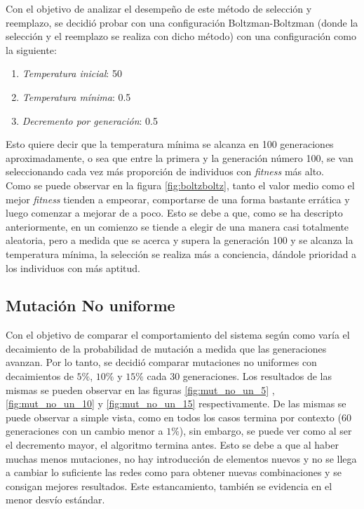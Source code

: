 \documentclass{sig-alternate}
\begin{document}
		Con el objetivo de analizar el desempeño de este método de selección y reemplazo, se decidió probar con una configuración Boltzman-Boltzman (donde la selección y el reemplazo se realiza con dicho método) con una configuración como la siguiente:
			
		\begin{enumerate}			
			\item \textit{Temperatura inicial}: 50
			\item \textit{Temperatura mínima}: 0.5
			\item \textit{Decremento por generación}: 0.5
			\label{eq:boltz}
		\end{enumerate}

		Esto quiere decir que la temperatura mínima se alcanza en 100 generaciones aproximadamente, 	o sea que entre la primera y la generación número 100, se van seleccionando cada vez más proporción de individuos con \textit{fitness} más alto.\\
		Como se puede observar en la figura \ref{fig:boltzboltz}, tanto el valor medio como el mejor \textit{fitness} tienden a empeorar, comportarse de una forma bastante errática y luego comenzar a mejorar de a poco. Esto se debe a que, como se ha descripto anteriormente, en un comienzo se tiende a elegir de una manera casi totalmente aleatoria, pero a medida que se acerca y supera la generación 100 y se alcanza la temperatura mínima, la selección se realiza más a conciencia, dándole prioridad a los individuos con más aptitud. 
		
		\subsection{Mutación No uniforme}
		
		Con el objetivo de comparar el comportamiento del sistema según como varía el decaimiento de la probabilidad de mutación a medida que las generaciones avanzan. Por lo tanto, se decidió comparar mutaciones no uniformes con decaimientos de $5\%$, $10\%$ y $15\%$ cada 30 generaciones. Los resultados de las mismas se pueden observar en las figuras \ref{fig:mut_no_un_5} , \ref{fig:mut_no_un_10} y \ref{fig:mut_no_un_15} respectivamente. De las mismas se puede observar a simple vista, como en todos los casos termina por contexto (60 generaciones con un cambio menor a $1\%$), sin embargo, se puede ver como al ser el decremento mayor, el algoritmo termina antes. Esto se debe a que al haber muchas menos mutaciones, no hay introducción de elementos nuevos y no se llega a cambiar lo suficiente las redes como para obtener nuevas combinaciones y se consigan mejores resultados. Este estancamiento, también se evidencia en el menor desvío estándar.
\end{document}
